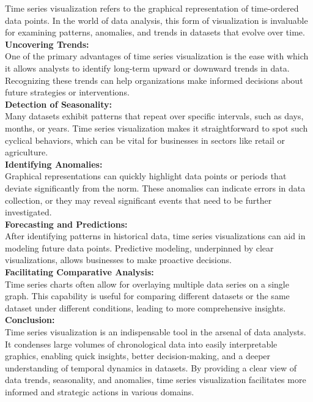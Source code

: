 \documentclass{article}\usepackage[]{graphicx}\usepackage[]{xcolor}
\begin{document}
Time series visualization refers to the graphical representation of time-ordered data points. In the world of data analysis, this form of visualization is invaluable for examining patterns, anomalies, and trends in datasets that evolve over time.\\
\textbf{Uncovering Trends:}\\
One of the primary advantages of time series visualization is the ease with which it allows analysts to identify long-term upward or downward trends in data. Recognizing these trends can help organizations make informed decisions about future strategies or interventions.\\
\textbf{Detection of Seasonality:}\\
Many datasets exhibit patterns that repeat over specific intervals, such as days, months, or years. Time series visualization makes it straightforward to spot such cyclical behaviors, which can be vital for businesses in sectors like retail or agriculture.\\
\textbf{Identifying Anomalies:}\\
Graphical representations can quickly highlight data points or periods that deviate significantly from the norm. These anomalies can indicate errors in data collection, or they may reveal significant events that need to be further investigated.\\
\textbf{Forecasting and Predictions:}\\
After identifying patterns in historical data, time series visualizations can aid in modeling future data points. Predictive modeling, underpinned by clear visualizations, allows businesses to make proactive decisions.\\
\textbf{Facilitating Comparative Analysis:}\\
Time series charts often allow for overlaying multiple data series on a single graph. This capability is useful for comparing different datasets or the same dataset under different conditions, leading to more comprehensive insights.\\
\textbf{Conclusion:}\\
Time series visualization is an indispensable tool in the arsenal of data analysts. It condenses large volumes of chronological data into easily interpretable graphics, enabling quick insights, better decision-making, and a deeper understanding of temporal dynamics in datasets. By providing a clear view of data trends, seasonality, and anomalies, time series visualization facilitates more informed and strategic actions in various domains.
\end{document}

